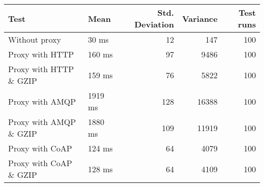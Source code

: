 \begin{tabular}{llrrr}
\hline
 Test                   & Mean    &   Std. Deviation &   Variance &   Test runs \\
\hline
 Without proxy          & 30 ms   &               12 &        147 &         100 \\
 Proxy with HTTP        & 160 ms  &               97 &       9486 &         100 \\
 Proxy with HTTP \& GZIP & 159 ms  &               76 &       5822 &         100 \\
 Proxy with AMQP        & 1919 ms &              128 &      16388 &         100 \\
 Proxy with AMQP \& GZIP & 1880 ms &              109 &      11919 &         100 \\
 Proxy with CoAP        & 124 ms  &               64 &       4079 &         100 \\
 Proxy with CoAP \& GZIP & 128 ms  &               64 &       4109 &         100 \\
\hline
\end{tabular}